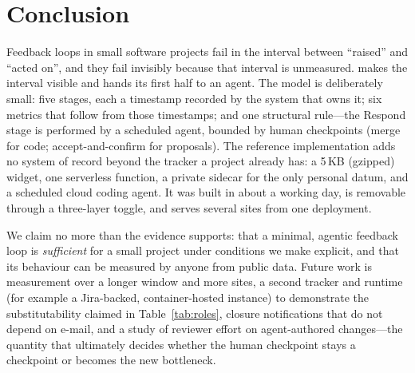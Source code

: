 \section{Conclusion}
Feedback loops in small software projects fail in the interval between ``raised'' and ``acted on'', and they fail invisibly because that interval is unmeasured. \ffrs{} makes the interval visible and hands its first half to an agent. The model is deliberately small: five stages, each a timestamp recorded by the system that owns it; six metrics that follow from those timestamps; and one structural rule---the Respond stage is performed by a scheduled agent, bounded by human checkpoints (merge for code; accept-and-confirm for proposals). The reference implementation adds no system of record beyond the tracker a project already has: a 5\,KB (gzipped) widget, one serverless function, a private sidecar for the only personal datum, and a scheduled cloud coding agent. It was built in about a working day, is removable through a three-layer toggle, and serves several sites from one deployment.

We claim no more than the evidence supports: that a minimal, agentic feedback loop is \emph{sufficient} for a small project under conditions we make explicit, and that its behaviour can be measured by anyone from public data. Future work is measurement over a longer window and more sites, a second tracker and runtime (for example a Jira-backed, container-hosted instance) to demonstrate the substitutability claimed in Table~\ref{tab:roles}, closure notifications that do not depend on e-mail, and a study of reviewer effort on agent-authored changes---the quantity that ultimately decides whether the human checkpoint stays a checkpoint or becomes the new bottleneck.
